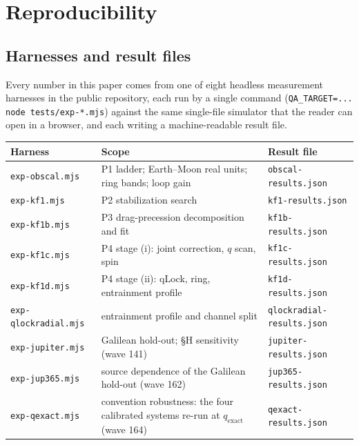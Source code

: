 \documentclass[aps,reprint,amsmath,amssymb,nofootinbib,superscriptaddress,floatfix]{revtex4-2}
\begin{document}
\section{Reproducibility}
\label{sec:repro}

\subsection{Harnesses and result files}
\label{sec:harnesses}

Every number in this paper comes from one of eight headless
measurement harnesses in the public repository, each run by a single
command
(\texttt{QA\_TARGET=... node tests/exp-*.mjs}) against the same
single-file simulator that the reader can open in a browser, and each
writing a machine-readable result file.

\begin{center}
{\small\setlength{\tabcolsep}{3pt}
\begin{tabularx}{\columnwidth}{@{}YYY@{}}
\toprule
Harness & Scope & Result file \\
\midrule
\texttt{exp-\allowbreak obscal.mjs} &
  P1 ladder; Earth--Moon real units; ring bands; loop gain &
  \texttt{obscal-\allowbreak results.json} \\
\texttt{exp-kf1.mjs} & P2 stabilization search &
  \texttt{kf1-\allowbreak results.json} \\
\texttt{exp-kf1b.mjs} & P3 drag-precession decomposition and fit &
  \texttt{kf1b-\allowbreak results.json} \\
\texttt{exp-kf1c.mjs} & P4 stage (i): joint correction, $q$ scan, spin &
  \texttt{kf1c-\allowbreak results.json} \\
\texttt{exp-kf1d.mjs} & P4 stage (ii): qLock, ring, entrainment profile &
  \texttt{kf1d-\allowbreak results.json} \\
\texttt{exp-\allowbreak qlockradial.mjs} &
  entrainment profile and channel split &
  \texttt{qlockradial-\allowbreak results.json} \\
\texttt{exp-\allowbreak jupiter.mjs} &
  Galilean hold-out; \S H sensitivity (wave 141) &
  \texttt{jupiter-\allowbreak results.json} \\
\texttt{exp-\allowbreak jup365.mjs} &
  source dependence of the Galilean hold-out (wave 162) &
  \texttt{jup365-\allowbreak results.json} \\
\texttt{exp-\allowbreak qexact.mjs} &
  convention robustness: the four calibrated systems re-run at
  $q_{\mathrm{exact}}$ (wave 164) &
  \texttt{qexact-\allowbreak results.json} \\
\bottomrule
\end{tabularx}}
\end{center}
\end{document}
